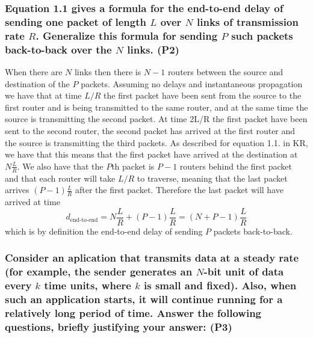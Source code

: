 \subsubsection{Equation 1.1 gives a formula for the end-to-end delay of sending one packet of length $L$ over $N$ links of transmission rate $R$. Generalize this formula for sending $P$ such packets back-to-back over the $N$ links. (P2)}
When there are $N$ links then there is $N-1$ routers between the source and destination of the $P$ packets. Assuming no delays and instantaneous propagation we have that at time $L/R$ the first packet have been sent from the source to the first router and is being transmitted to the same router, and at the same time the source is transmitting the second packet. At time 2L/R the first packet have been sent to the second router, the second packet has arrived at the first router and the source is transmitting the third packets. As described for equation 1.1. in KR, we have that this means that the first packet have arrived at the destination at $N \frac{L}{R}$. We also have that the $P$th packet is $P-1$ routers behind the first packet and that each router will take $L/R$ to traverse, meaning that the last packet arrives $(P-1) \frac{L}{R}$ after the first packet. Therefore the last packet will have arrived at time 
\begin{equation*}
    d_{\text{end-to-end}} = N \frac{L}{R} + (P-1) \frac{L}{R} = (N + P-1) \frac{L}{R}
\end{equation*}
which is by definition the end-to-end delay of sending $P$ packets back-to-back.


\subsubsection{Consider an aplication that transmits data at a steady rate (for example, the sender generates an $N$-bit unit of data every $k$ time units, where $k$ is small and fixed). Also, when such an application starts, it will continue running for a relatively long period of time. Answer the following questions, briefly justifying your answer: (P3)}

